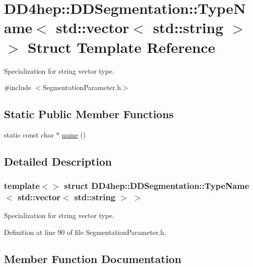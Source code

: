 \hypertarget{struct_d_d4hep_1_1_d_d_segmentation_1_1_type_name_3_01std_1_1vector_3_01std_1_1string_01_4_01_4}{}\section{D\+D4hep\+:\+:D\+D\+Segmentation\+:\+:Type\+Name$<$ std\+:\+:vector$<$ std\+:\+:string $>$ $>$ Struct Template Reference}
\label{struct_d_d4hep_1_1_d_d_segmentation_1_1_type_name_3_01std_1_1vector_3_01std_1_1string_01_4_01_4}


Specialization for string vector type.  




{\ttfamily \#include $<$Segmentation\+Parameter.\+h$>$}

\subsection*{Static Public Member Functions}
\begin{DoxyCompactItemize}
\item 
static const char $\ast$ \hyperlink{struct_d_d4hep_1_1_d_d_segmentation_1_1_type_name_3_01std_1_1vector_3_01std_1_1string_01_4_01_4_a7e4aef1131e525dddbb008626edb07fc}{name} ()
\end{DoxyCompactItemize}


\subsection{Detailed Description}
\subsubsection*{template$<$$>$\newline
struct D\+D4hep\+::\+D\+D\+Segmentation\+::\+Type\+Name$<$ std\+::vector$<$ std\+::string $>$ $>$}

Specialization for string vector type. 

Definition at line 90 of file Segmentation\+Parameter.\+h.



\subsection{Member Function Documentation}
\hypertarget{struct_d_d4hep_1_1_d_d_segmentation_1_1_type_name_3_01std_1_1vector_3_01std_1_1string_01_4_01_4_a7e4aef1131e525dddbb008626edb07fc}{}\label{struct_d_d4hep_1_1_d_d_segmentation_1_1_type_name_3_01std_1_1vector_3_01std_1_1string_01_4_01_4_a7e4aef1131e525dddbb008626edb07fc} 
